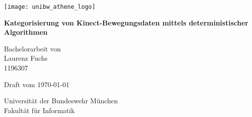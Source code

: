 \thispagestyle{empty}

\begin{center}

\vspace*{1cm}

\texttt{[image: unibw\_athene\_logo]}

\vspace{1.5cm}
{\Huge 
\textbf{Kategorisierung von Kinect-Bewegungsdaten mittels deterministischer Algorithmen}\\
}
\vspace{1.5cm}


{\Large
Bachelorarbeit von\\
Laurenz Fuchs\\
1196307\\
}

\vspace{1cm}
Draft vom \today %

\vfill

{\Large 
Universität der Bundeswehr München\\
Fakultät für Informatik\\
}


\end{center}

\newpage

\thispagestyle{empty}
\cleardoublepage

\thispagestyle{empty}

